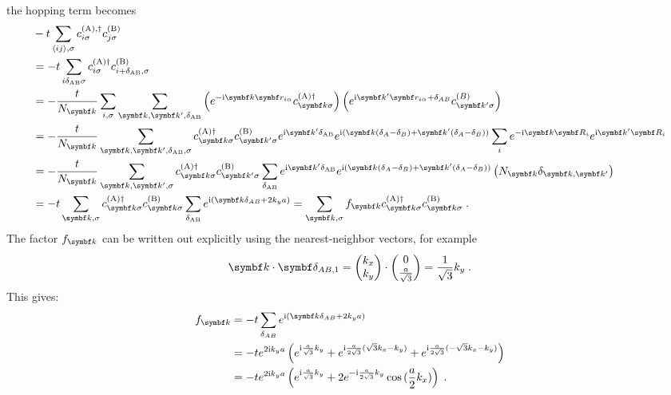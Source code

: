 \documentclass[../main.tex]{subfiles}
\begin{document}
the hopping term becomes
\begin{align}
	&-t \sum_{\langle ij \rangle, \sigma} c_{i \sigma}^{(\mathrm{A}), \dagger} c_{j \sigma}^{(\mathrm{B})} \\
	&= -t \sum_{i \delta_{\mathrm{AB}} \sigma} c_{i \sigma}^{(\mathrm{A}) \dagger} c_{i + \delta_{\mathrm{AB}}, \sigma}^{(\mathrm{B})} \\
	&= -\frac{t}{N_{\vb{k}}} \sum_{i,\sigma} \sum_{\vb{k}, \vb{k}^{\prime}, \delta_{\mathrm{AB}}} \left(e^{-\iu \vb{k} \vb{r}_{i \alpha}} c_{\vb{k} \sigma}^{(\mathrm{A}) \dagger}\right) \left(e^{\iu \vb{k}^{\prime} \vb{r}_{i \alpha} +\delta_{AB}} c_{\vb{k}^{\prime} \sigma}^{(B)} \right) \\
	&= -\frac{t}{N_{\vb{k}}} \sum_{\vb{k}, \vb{k^{\prime}}, \delta_{\mathrm{AB}}, \sigma} c_{\vb{k} \sigma}^{(\mathrm{A}) \dagger} c_{\vb{k}^{\prime} \sigma}^{(\mathrm{B})} e^{\iu \vb{k}^{\prime} \delta_{\mathrm{AB}}} e^{\iu (\vb{k} (\delta_A - \delta_B) + \vb{k}^{\prime} (\delta_A - \delta_B))} \sum_{i} e^{-\iu \vb{k} \vb{R}_i} e^{\iu \vb{k}^{\prime} \vb{R}_i} \\
	&= -\frac{t}{N_{\vb{k}}} \sum_{\vb{k}, \vb{k^{\prime}}, \sigma}  c_{\vb{k} \sigma}^{(\mathrm{A}) \dagger} c_{\vb{k}^{\prime} \sigma}^{(\mathrm{B})} \sum_{\delta_{\mathrm{AB}}} e^{\iu \vb{k}^{\prime} \delta_{\mathrm{AB}}} e^{\iu (\vb{k} (\delta_A - \delta_B) + \vb{k}^{\prime} (\delta_A - \delta_B))} \left(N_{\vb{k}} \delta_{\vb{k}, \vb{k}^{\prime}} \right)\\
	&= -t \sum_{\vb{k}, \sigma}  c_{\vb{k} \sigma}^{(\mathrm{A}) \dagger} c_{\vb{k} \sigma}^{(\mathrm{B})} \sum_{\delta_{\mathrm{AB}}} e^{\iu (\vb{k} \delta_{AB} + 2 k_y a)} = \sum_{\vb{k}, \sigma} f_{\vb{k}} c_{\vb{k} \sigma}^{(\mathrm{A}) \dagger} c_{\vb{k} \sigma}^{(\mathrm{B})} \;.
\end{align}
The factor \(f_{\vb{k}}\) can be written out explicitly using the nearest-neighbor vectors, for example
\begin{align}
	\vb{k} \cdot \vb{\delta_{AB, 1}} = \begin{pmatrix} k_x \\ k_y \end{pmatrix} \cdot \begin{pmatrix} 0 \\ \frac{a}{\sqrt{3}} \end{pmatrix} = \frac{1}{\sqrt{3}} k_y \;.
\end{align}
This gives:
\begin{align}
	f_{\vb{k}} &= -t \sum_{\delta_{AB}} e^{\iu (\vb{k} \delta_{AB} + 2 k_y a)} \\
	&= -t e^{2 \iu k_y a} \left(
	e^{\iu \frac{a}{\sqrt{3}} k_y} +
	e^{\iu \frac{a}{2\sqrt{3}} (\sqrt{3} k_x - k_y)} +
	e^{\iu \frac{a}{2\sqrt{3}} (-\sqrt{3} k_x - k_y)} \right) \\
	&= -t e^{2 \iu k_y a} \left(
	e^{\iu \frac{a}{\sqrt{3}} k_y} +
	2 e^{-\iu \frac{a}{2\sqrt{3}} k_y}
	\cos{(\frac{a}{2} k_x)} \right) \;.
\end{align}
\end{document}

